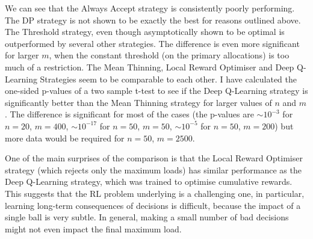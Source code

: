 We can see that the Always Accept strategy is consistently poorly performing. The DP strategy is not shown to be exactly the best for reasons outlined above. The Threshold strategy, even though asymptotically shown to be optimal is outperformed by several other strategies. The difference is even more significant for larger $m$, when the constant threshold (on the primary allocations) is too much of a restriction. The Mean Thinning, Local Reward Optimiser and Deep Q-Learning Strategies seem to be comparable to each other. I have calculated the one-sided p-values of a two sample t-test to see if the Deep Q-Learning strategy is significantly better than the Mean Thinning strategy for larger values of $n$ and $m$. The difference is significant for most of the cases (the p-values are $\sim 10^{-3}$ for $n=20$, $m=400$, $\sim 10^{-17}$ for $n=50$, $m=50$, $\sim 10^{-5}$ for $n=50$, $m=200$) but more data would be required for $n=50$, $m=2500$.  



One of the main surprises of the comparison is that the Local Reward Optimiser strategy (which rejects only the maximum loads) has similar performance as the Deep Q-Learning strategy, which was trained to optimise cumulative rewards. This suggests that the RL problem underlying \TwoThinning is a challenging one, in particular, learning long-term consequences of decisions is difficult, because the impact of a single ball is very subtle. In general, making a small number of bad decisions might not even impact the final maximum load. 


